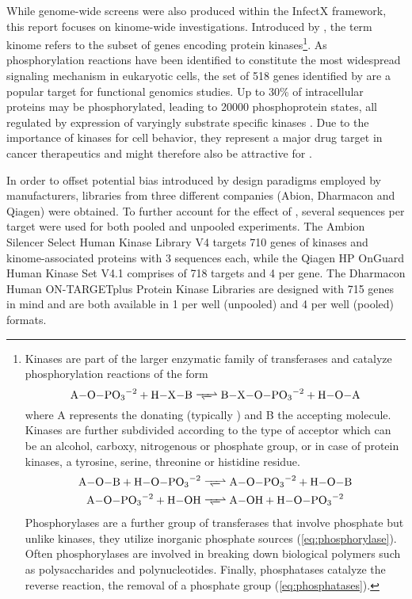 While genome-wide  screens were also produced within the InfectX framework, this report focuses on kinome-wide investigations. Introduced by \citet{Manning2002}, the term kinome refers to the subset of genes encoding protein kinases\footnote{Kinases are part of the larger enzymatic family of transferases and catalyze phosphorylation reactions of the form
\begin{equation}
  \ce{A\bond{-}O\bond{-}PO3^{-2} + H\bond{-}X\bond{-}B <=>> B\bond{-}X\bond{-}O\bond{-}PO3^{-2} + H\bond{-}O\bond{-}A} \label{eq:kinase}
\end{equation}
where A represents the donating (typically ) and B the accepting molecule. Kinases are further subdivided according to the type of acceptor which can be an alcohol, carboxy, nitrogenous or phosphate group, or in case of protein kinases, a tyrosine, serine, threonine or histidine residue.
\begin{align}
  \ce{A\bond{-}O\bond{-}B + H\bond{-}O\bond{-}PO3^{-2} &<=>> A\bond{-}O\bond{-}PO3^{-2} + H\bond{-}O\bond{-}B} \label{eq:phosphorylase} \\
  \ce{A\bond{-}O\bond{-}PO3^{-2} + H\bond{-}OH &<=>> A\bond{-}OH + H\bond{-}O\bond{-}PO3^{-2}} \label{eq:phosphatases}
\end{align}
Phosphorylases are a further group of transferases that involve phosphate but unlike kinases, they utilize inorganic phosphate sources (\ref{eq:phosphorylase}). Often phosphorylases are involved in breaking down biological polymers such as polysaccharides and polynucleotides. Finally, phosphatases catalyze the reverse reaction, the removal of a phosphate group (\ref{eq:phosphatases}).}. As phosphorylation reactions have been identified to constitute the most widespread signaling mechanism in eukaryotic cells, the set of 518 genes identified by \citeauthor{Manning2002} are a popular target for functional genomics studies. Up to 30\% of intracellular proteins may be phosphorylated, leading to 20000 phosphoprotein states, all regulated by expression of varyingly substrate specific kinases \citep{Johnson2005}. Due to the importance of kinases for cell behavior, they represent a major drug target in cancer therapeutics and might therefore also be attractive for .

In order to offset potential bias introduced by  design paradigms employed by manufacturers, libraries from three different companies (Abion, Dharmacon and Qiagen) were obtained. To further account for the effect of , several  sequences per target were used for both pooled and unpooled experiments. The Ambion Silencer Select Human Kinase  Library V4 targets 710 genes of kinases and kinome-associated proteins with 3 sequences each, while the Qiagen HP OnGuard Human Kinase  Set V4.1 comprises of 718 targets and 4  per gene. The Dharmacon Human ON-TARGETplus  Protein Kinase Libraries are designed with 715 genes in mind and are both available in 1  per well (unpooled) and 4  per well (pooled) formats.

